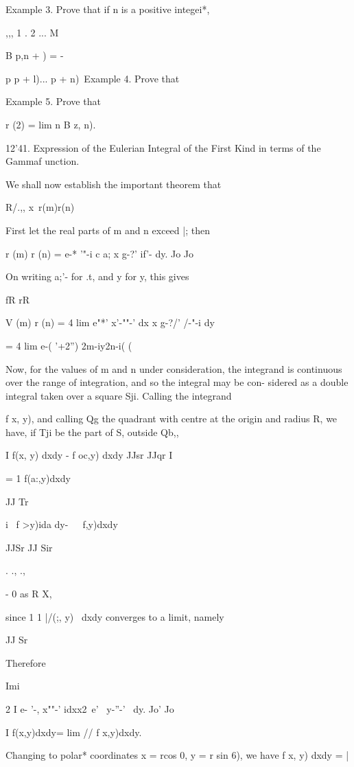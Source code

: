 Example 3. Prove that if n is a positive integei*,

,,, 1 . 2 ... M

B p,n + ) = -

p p + l)... p + n)\ Example 4. Prove that

Example 5. Prove that

r (2) = lim n B z, n).

12'41. Expression of the Eulerian Integral of the First Kind in terms
of the Gammaf unction.

We shall now establish the important theorem that

R/.,, x\ r(m)r(n)

First let the real parts of m and n exceed |; then

r (m) r (n) = e-* '"-i c a; x g-?' if'- dy. Jo Jo

On writing a;'- for .t, and y for y, this gives

fR rR

V (m) r (n) = 4 lim e"*' x'-""-' dx x g-?/' /-"-i dy

= 4 lim e-( '+2'') 2m-iy2n-i( ( \

Now, for the values of m and n under consideration, the integrand is
continuous over the range of integration, and so the integral may be
con- sidered as a double integral taken over a square Sji. Calling the
integrand

%
%

f x, y), and calling Qg the quadrant with centre at the origin and
radius R, we have, if Tji be the part of S, outside Qb,,

I f(x, y) dxdy - f oc,y) dxdy JJsr JJqr I

= 1 f(a:,y)dxdy

 JJ Tr

i \ f >y)ida dy-\ \ \ f,y)dxdy\

JJSr JJ Sir

  . ., .,

- 0 as R X,

since 1 1 |/(;, y) \ dxdy converges to a limit, namely

JJ Sr

Therefore

Imi

2 I e- '-, x""-' idxx2\ e' \ y-''-' \ dy. Jo' Jo

I f(x,y)dxdy= lim // f x,y)dxdy.

Changing to polar* coordinates x = rcos 0, y = r sin 6), we have f x,
y) dxdy = |

